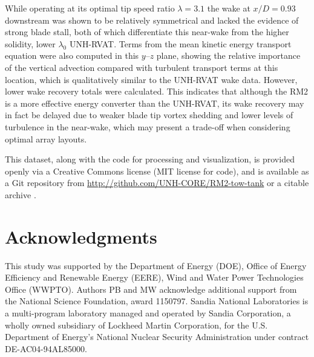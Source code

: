 \documentclass[10pt,letterpaper]{article}
\begin{document}
While operating at its optimal tip speed ratio $\lambda=3.1$ the wake at
$x/D=0.93$ downstream was shown to be relatively symmetrical and lacked the
evidence of strong blade stall, both of which differentiate this near-wake from
the higher solidity, lower $\lambda_0$ UNH-RVAT. Terms from the mean kinetic
energy transport equation were also computed in this $y$--$z$ plane, showing the
relative importance of the vertical advection compared with turbulent transport
terms at this location, which is qualitatively similar to the UNH-RVAT wake
data. However, lower wake recovery totals were calculated. This indicates that
although the RM2 is a more effective energy converter than the UNH-RVAT, its
wake recovery may in fact be delayed due to weaker blade tip vortex shedding and
lower levels of turbulence in the near-wake, which may present a trade-off when
considering optimal array layouts.

This dataset, along with the code for processing and visualization, is provided
openly via a Creative Commons license (MIT license for code), and is available
as a Git repository from \url{http://github.com/UNH-CORE/RM2-tow-tank} or a
citable archive \cite{Bachant2016-RM2-data}.


\section*{Acknowledgments}

This study was supported by the Department of Energy (DOE), Office of Energy
Efficiency and Renewable Energy (EERE), Wind and Water Power Technologies Office
(WWPTO). Authors PB and MW acknowledge additional support from the National
Science Foundation, award 1150797. Sandia National Laboratories is a
multi-program laboratory managed and operated by Sandia Corporation, a wholly
owned subsidiary of Lockheed Martin Corporation, for the U.S. Department of
Energy's National Nuclear Security Administration under contract
DE-AC04-94AL85000.

\nolinenumbers
\end{document}
